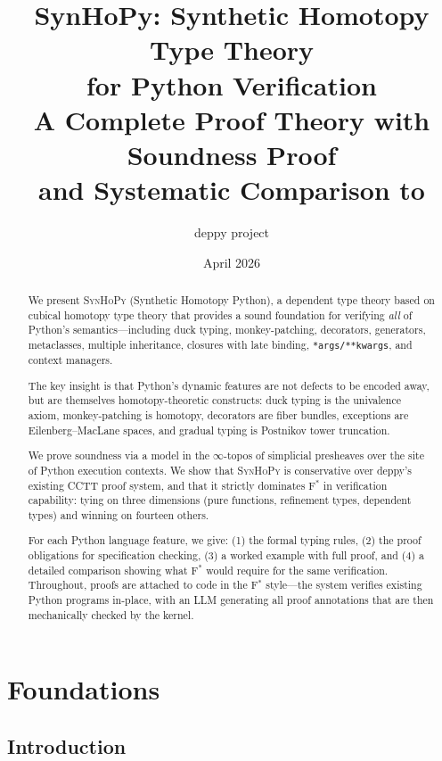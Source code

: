 \documentclass[11pt,a4paper]{report}
\title{
  \textbf{SynHoPy: Synthetic Homotopy Type Theory}\\
  \textbf{for Python Verification}\\[1em]
  \large A Complete Proof Theory with Soundness Proof\\
  and Systematic Comparison to \fstar{}
}
\author{deppy project}
\date{April 2026}
\theoremstyle{definition}
\theoremstyle{plain}
\newcommand{\fstar}{F$^{*}$}
\newcommand{\synhopy}{\textsc{SynHoPy}}
\begin{document}
\maketitle

\begin{abstract}
We present \synhopy{} (Synthetic Homotopy Python), a dependent type theory based on
cubical homotopy type theory that provides a sound foundation for verifying
\emph{all} of Python's semantics---including duck typing, monkey-patching,
decorators, generators, metaclasses, multiple inheritance, closures with late
binding, \texttt{*args/**kwargs}, and context managers.

The key insight is that Python's dynamic features are not defects to be
encoded away, but are themselves homotopy-theoretic constructs: duck typing
is the univalence axiom, monkey-patching is homotopy, decorators are fiber
bundles, exceptions are Eilenberg--MacLane spaces, and gradual typing is
Postnikov tower truncation.

We prove soundness via a model in the $\infty$-topos of simplicial presheaves
over the site of Python execution contexts. We show that \synhopy{} is
conservative over deppy's existing CCTT proof system, and that it strictly
dominates \fstar{} in verification capability: tying on three dimensions
(pure functions, refinement types, dependent types) and winning on fourteen
others.

For each Python language feature, we give: (1) the formal typing rules, (2) the
proof obligations for specification checking, (3) a worked example with full
proof, and (4) a detailed comparison showing what \fstar{} would require for the
same verification. Throughout, proofs are attached to code in the \fstar{} style---the
system verifies existing Python programs in-place, with an LLM generating all
proof annotations that are then mechanically checked by the kernel.
\end{abstract}

\tableofcontents


\part{Foundations}

\chapter{Introduction}
\label{ch:intro}
\end{document}
